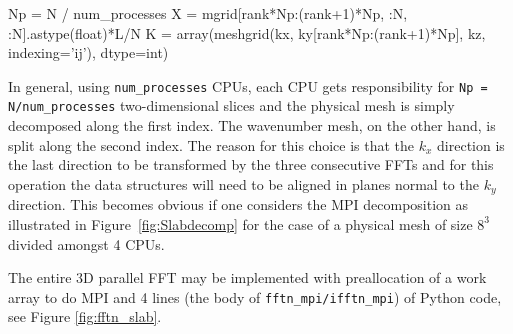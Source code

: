 \documentclass[final,1p,times]{elsarticle}
\newcommand{\inpyth}{\lstinline[style=inlinestyle]} %[]%
\begin{document}
\begin{python}
Np = N / num_processes
X = mgrid[rank*Np:(rank+1)*Np, :N, :N].astype(float)*L/N
K = array(meshgrid(kx, ky[rank*Np:(rank+1)*Np], kz,
                   indexing='ij'), dtype=int)
\end{python}
In general, using \inpyth{num_processes} CPUs, each CPU gets responsibility for \inpyth{Np = N/num_processes} two-dimensional slices and the physical mesh is simply decomposed along the first index. The wavenumber mesh, on the other hand, is split along the second index. The reason for this choice is that the $k_x$ direction is the last direction to be transformed by the three consecutive FFTs and for this operation the data structures will need to be aligned in planes normal to the $k_y$ direction. This becomes obvious if one considers the MPI decomposition as illustrated in Figure~\ref{fig:Slabdecomp} for the case of a physical mesh of size $8^3$ divided amongst 4 CPUs.

The entire 3D parallel FFT may be implemented with preallocation of a work array to do MPI and 4 lines (the body of \inpyth{fftn_mpi/ifftn_mpi}) of Python code, see Figure \ref{fig:fftn_slab}.
\end{document}
